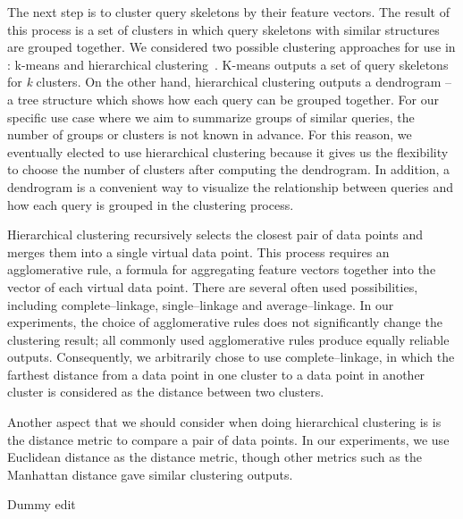 The next step is to cluster query skeletons by their feature vectors. The result of this process is a set of clusters in which query skeletons with similar structures are grouped together. We considered two possible clustering approaches for use in \sysname{}: k-means and hierarchical clustering~\cite{xu2005survey}.
K-means outputs a set of query skeletons for \textit{k} clusters. 
On the other hand, hierarchical clustering outputs a dendrogram -- a tree structure which shows how each query can be grouped together. 
For our specific use case where we aim to summarize groups of similar queries, the number of groups or clusters is not known in advance. For this reason, we eventually elected to use hierarchical clustering because it gives us the flexibility to choose the number of clusters after computing the dendrogram. 
In addition, a dendrogram is a convenient way to visualize the relationship between queries and how each query is grouped in the clustering process. 

Hierarchical clustering recursively selects the closest pair of data points and merges them into a single virtual data point.  This process requires an agglomerative rule, a formula for aggregating feature vectors together into the vector of each virtual data point.
There are several often used possibilities, including complete--linkage, single--linkage and average--linkage.
In our experiments, the choice of agglomerative rules does not significantly change the clustering result; all commonly used agglomerative rules produce equally reliable outputs.
Consequently, we arbitrarily chose to use complete--linkage, in which the farthest distance from a data point in one cluster to a data point in another cluster is considered as the distance between two clusters. 

Another aspect that we should consider when doing hierarchical clustering is is the distance metric to compare a pair of data points. 
In our experiments, we use Euclidean distance as the distance metric, though other metrics such as the Manhattan distance gave similar clustering outputs.


Dummy edit